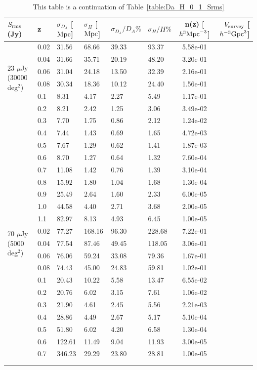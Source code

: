 \documentclass[useAMS,usenatbib]{mn2e}
\begin{document}
\begin{table}
\caption{This table is a continuation of Table~\ref{table:Da_H_0_1_Srms}}
\begin{tabular}{l|l|l|l|l|lc||r}
\hline
\hline 
\multirow{1}{*}{ $S_{\rm rms}$ (Jy) }& z & $\sigma_{D_A}$ [${\rm Mpc}$]&  $\sigma_{H}$ [${\rm Mpc}$]& $\sigma_{D_A}/{D_A} \%$ & $\sigma_{H}/H\%$ &n(z) [$h^{3} {\rm Mpc}^{-3}$]& $V_{\rm survey}$ [$h^{-3} {\rm Gpc}^3$]\\
\hline
\hline
\multirow{6}{*}{ 23 $\mu$Jy   (30000 deg$^2$)}
& 0.02 &  31.56 & 68.66 & 39.33 & 93.37 & 5.58e-01 \\
& 0.04 &  31.66 & 35.71 & 20.19 & 48.20 & 3.20e-01 \\
& 0.06 &  31.04 & 24.18 & 13.50 & 32.39 & 2.16e-01 \\
& 0.08 &  30.34 & 18.36 & 10.12 & 24.40 & 1.56e-01 \\
& 0.1 &  8.31 & 4.17 & 2.27 & 5.49 & 1.17e-01 \\
& 0.2 &  8.21 & 2.42 & 1.25 & 3.06 & 3.49e-02 \\
& 0.3 &  7.70 & 1.75 & 0.86 & 2.12 & 1.24e-02 \\
& 0.4 &  7.44 & 1.43 & 0.69 & 1.65 & 4.72e-03 \\
& 0.5 &  7.67 & 1.29 & 0.62 & 1.41 & 1.87e-03 \\
& 0.6 &  8.70 & 1.27 & 0.64 & 1.32 & 7.60e-04 \\
& 0.7 &  11.08 & 1.42 & 0.76 & 1.39 & 3.10e-04 \\
& 0.8 &  15.92 & 1.80 & 1.04 & 1.68 & 1.30e-04 \\
& 0.9 &  25.49 & 2.64 & 1.60 & 2.33 & 6.00e-05 \\
& 1.0 &  44.58 & 4.40 & 2.71 & 3.68 & 2.00e-05 \\
& 1.1 &  82.97 & 8.13 & 4.93 & 6.45 & 1.00e-05 \\
\hline
\multirow{3}{*}{ 70 $\mu$Jy (5000 deg$^2$) }
& 0.02 &  77.27 & 168.16 & 96.30 & 228.68 & 7.22e-01 \\
& 0.04 &  77.54 & 87.46 & 49.45 & 118.05 & 3.06e-01 \\
& 0.06 &  76.06 & 59.24 & 33.08 & 79.36 & 1.67e-01 \\
& 0.08 &  74.43 & 45.00 & 24.83 & 59.81 & 1.02e-01 \\
& 0.1 &  20.43 & 10.22 & 5.58 & 13.47 & 6.55e-02 \\
& 0.2 &  20.76 & 6.02 & 3.15 & 7.61 & 1.06e-02 \\
& 0.3 &  21.90 & 4.61 & 2.45 & 5.56 & 2.21e-03 \\
& 0.4 &  28.86 & 4.49 & 2.67 & 5.17 & 5.10e-04 \\
& 0.5 &  51.80 & 6.02 & 4.20 & 6.58 & 1.30e-04 \\
& 0.6 &  122.61 & 11.49 & 9.04 & 11.93 & 3.00e-05 \\
& 0.7 &  346.23 & 29.29 & 23.80 & 28.81 & 1.00e-05 \\
 \hline\\\\
\end{tabular}
\label{table:Da_H_7point3_23_Srms}
\end{table}
\end{document}
